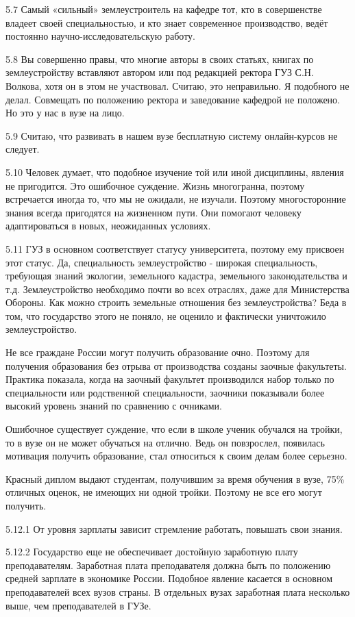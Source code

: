 5.7 Самый «сильный» землеустроитель на кафедре тот, кто в совершенстве владеет своей специальностью, и кто знает современное производство, ведёт постоянно научно-исследовательскую работу.

5.8 Вы совершенно правы, что многие авторы в своих статьях, книгах по землеустройству вставляют автором или под редакцией ректора ГУЗ С.Н. Волкова, хотя он в этом не участвовал. Считаю, это неправильно. Я подобного не делал. Совмещать по положению ректора и заведование кафедрой не положено. Но это у нас в вузе на лицо.

5.9 Считаю, что развивать в нашем вузе бесплатную систему онлайн-курсов не следует.

5.10 Человек думает, что подобное изучение той или иной дисциплины, явления не пригодится. Это ошибочное суждение. Жизнь многогранна, поэтому встречается иногда то, что мы не ожидали, не изучали. Поэтому многосторонние знания всегда пригодятся на жизненном пути. Они помогают человеку адаптироваться в новых, неожиданных условиях.

5.11 ГУЗ в основном соответствует статусу университета, поэтому ему присвоен этот статус. Да, специальность землеустройство - широкая специальность, требующая знаний экологии, земельного кадастра, земельного законодательства и т.д. Землеустройство необходимо почти во всех отраслях, даже для Министерства Обороны. Как можно строить земельные отношения без землеустройства? Беда в том, что государство этого не поняло, не оценило и фактически уничтожило землеустройство.

Не все граждане России могут получить образование очно. Поэтому для получения образования без отрыва от производства созданы заочные факультеты. Практика показала, когда на заочный факультет производился набор только по специальности или родственной специальности, заочники показывали более высокий уровень знаний по сравнению с очниками.

Ошибочное существует суждение, что если в школе ученик обучался на тройки, то в вузе он не может обучаться на отлично. Ведь он повзрослел, появилась мотивация получить образование, стал относиться к своим делам более серьезно.

Красный диплом выдают студентам, получившим за время обучения в вузе, 75\% отличных оценок, не имеющих ни одной тройки. Поэтому не все его могут получить.

5.12.1 От уровня зарплаты зависит стремление работать, повышать свои знания.

5.12.2 Государство еще не обеспечивает достойную заработную плату преподавателям. Заработная плата преподавателя должна быть по положению средней зарплате в экономике России. Подобное явление касается в основном преподавателей всех вузов страны. В отдельных вузах заработная плата несколько выше, чем преподавателей в ГУЗе.

